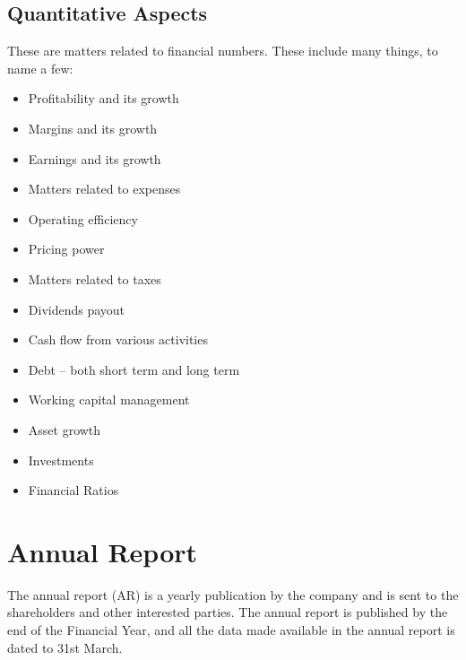 \subsection{Quantitative Aspects}
These are matters related to financial numbers. These include many things, to name a few:
\begin{itemize}
  \item Profitability and its growth
  \item Margins and its growth
  \item Earnings and its growth
  \item Matters related to expenses
  \item Operating efficiency
  \item Pricing power
  \item Matters related to taxes
  \item Dividends payout
  \item Cash flow from various activities
  \item Debt – both short term and long term
  \item Working capital management
  \item Asset growth
  \item Investments
  \item Financial Ratios
\end{itemize}


\section{Annual Report}
The annual report (AR) is a yearly publication by the company and is sent to the shareholders and other interested parties. The annual report is published by the end of the Financial Year, and all the data made available in the annual report is dated to 31st March.

